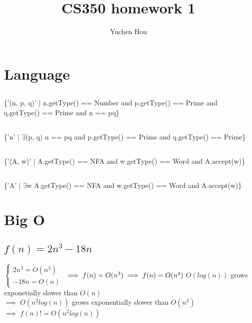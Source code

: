 \documentclass{article}
\begin{document}
\title{CS350 homework 1}
\author{Yuchen Hou}
\maketitle

\section{Language}

\subsection{}
\{'(n, p, q)' $\mid$ n.getType() == Number and p.getType() == Prime and
q.getType() == Prime and n == pq\}

\subsection{}
\{'n' $\mid$ $\exists$(p, q) n == pq and p.getType() == Prime and q.getType() ==
Prime\}

\subsection{}
\{'(A, w)' $\mid$ A.getType() == NFA and w.getType() == Word and A.accept(w)\}

\subsection{}
\{'A' $\mid$ $\exists$w A.getType() == NFA and w.getType() == Word and
A.accept(w)\}

\section{Big O}

\subsection{$f(n) = 2n^3 - 18n$}
$\begin{cases}
2n^3 = O(n^3)\\
-18n = O(n)
\end{cases}$
$\implies f(n) = O(n^3) \implies f(n) = O(n^4) \\$
$O(log(n))$ grows exponetially slower than $O(n)$ \\
$\implies$ $O(n^2log(n))$ grows exponentially slower than $O(n^3)$ \\
$\implies$ $f(n) != O(n^2log(n))$
\end{document}

